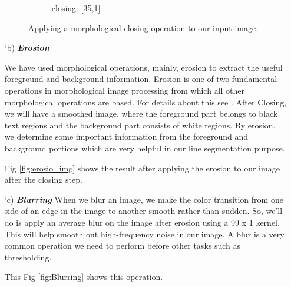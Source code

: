 \begin{itemize}
\begin{figure}[!htb]
\begin{subfigure}[b]{0.4\textwidth}
                 \caption{closing: [35,1]}
                 \label{fig:close2}
             \end{subfigure}
            \caption{Applying a morphological closing operation to our input image.}
            \label{fig:closing}
        \end{figure}

        \item[\char `b)] \textit{\textbf{Erosion}}
        
        We have used morphological operations, mainly, erosion to extract the useful foreground and background information. Erosion is one of two fundamental operations in morphological image processing from which all other morphological operations are based. For details about this see \cite{esosion}. After Closing, we will have a smoothed image, where the foreground part belongs to black text regions and the background part consists of white regions. By erosion, we determine some important information from the foreground and background portions which are very helpful in our line segmentation purpose.
        
        Fig \ref{fig:erosio_img} shows the result after applying the erosion to our image after the closing step.

        \item[\char `c)] \textit{\textbf{Blurring}}
        When we blur an image, we make the color transition from one side of an edge in the image to another smooth rather than sudden. So, we’ll do is apply an average blur on the image after erosion  using a 99 x 1 kernel. This will help smooth out high-frequency noise in our image. A blur is a very common operation we need to perform before other tasks such as thresholding.
        
        This Fig \ref{fig:Blurring} shows this operation.
        

\end{itemize}
